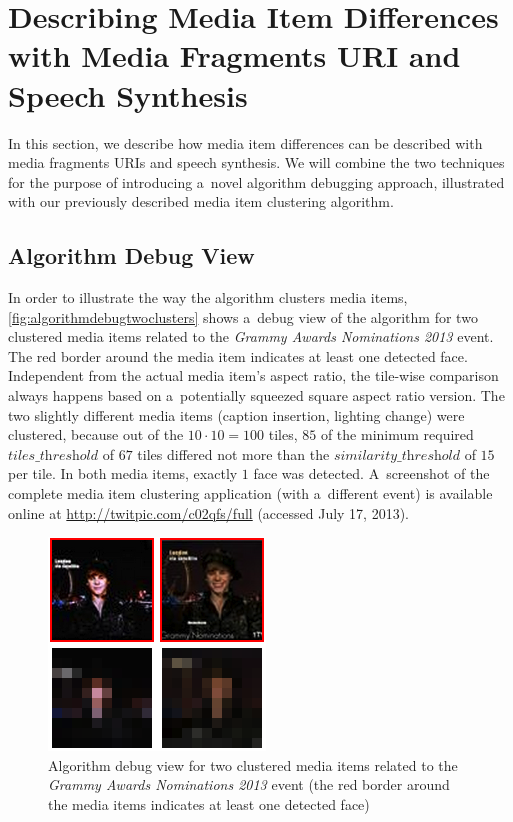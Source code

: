 \section{Describing Media Item Differences with Media Fragments URI and Speech Synthesis}

In this section, we describe how media item differences
can be described with media fragments URIs and speech synthesis.
We will combine the two techniques for the purpose of
introducing a~novel algorithm debugging approach,
illustrated with our previously described
media item clustering algorithm.

\subsection{Algorithm Debug View}
\label{sec:algorithm-debug-view}

In order to illustrate the way the algorithm clusters media items,
\autoref{fig:algorithmdebugtwoclusters} shows a~debug view of the algorithm
for two clustered media items related to the 
\emph{Grammy Awards Nominations 2013} event.
The red border around the media item indicates at least one detected face.
Independent from the actual media item's aspect ratio,
the tile-wise comparison always happens based on a~potentially squeezed
square aspect ratio version.
The two slightly different media items (caption insertion, lighting change)
were clustered, because out of the $10 \cdot 10 = 100$ tiles,
$85$ of the minimum required $\textit{tiles\_threshold}$ of $67$ tiles differed not more
than the $\textit{similarity\_threshold}$ of $15$ per tile.
In both media items, exactly $1$ face was detected.
A~screenshot of the complete media item clustering application (with a~different event)
is available online at \url{http://twitpic.com/c02qfs/full} (accessed July 17, 2013).

\begin{figure}[!ht]
  \centering
  \includegraphics[width=0.5\linewidth]{./algorithmdebug.png}
  \caption[Algorithm debug view for two clustered media items]
  {Algorithm debug view for two clustered media items
  related to the \emph{Grammy Awards Nominations 2013} event
  (the red border around the media items indicates at least one detected face)}
  \label{fig:algorithmdebugtwoclusters}
\end{figure}

